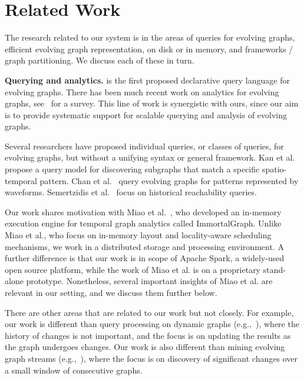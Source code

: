 \section{Related Work}
\label{sec:related}

The research related to our \ql system is in the areas of queries for
evolving graphs, efficient evolving graph representation, on disk or
in memory, and frameworks / graph partitioning.  We discuss each of
these in turn.

{\bf Querying and analytics.} \ql is the first proposed declarative
query language for evolving graphs.  There has been much recent work
on analytics for evolving graphs,
see~\cite{DBLP:journals/csur/AggarwalS14} for a survey. This line of
work is synergistic with ours, since our aim is to provide systematic
support for scalable querying and analysis of evolving graphs.

Several researchers have proposed individual queries, or classes of
queries, for evolving graphs, but without a unifying syntax or general
framework.  Kan et al.~\cite{Kan2009} propose a query model for
discovering subgraphs that match a specific spatio-temporal pattern.
Chan et al.~\cite{Chan2008} query evolving graphs for patterns
represented by waveforms.  Semertzidis et al.~\cite{Semertzidis2015}
focus on historical reachability queries.

Our work shares motivation with Miao et
al.~\cite{DBLP:journals/tos/MiaoHLWYZPCC15}, who developed an
in-memory execution engine for temporal graph analytics called
ImmortalGraph.  Unlike Miao et al., who focus on in-memory layout and
locality-aware scheduling mechanisms, we work in a distributed storage
and processing environment.  A further difference is that our work is
in scope of Apache Spark, a widely-used open source platform, while
the work of Miao et al. is on a proprietary stand-alone prototype.
Nonetheless, several important insights of Miao et al. are relevant in
our setting, and we discuss them further below.

There are other areas that are related to our work but not closely.
For example, our work is different than query processing on dynamic
graphs (e.g.,~\cite{Mondal2012}), where the history of changes is not
important, and the focus is on updating the results as the graph
undergoes changes.  Our work is also different than mining evolving
graph streams (e.g.,~\cite{Liu2010}), where the focus is on discovery
of significant changes over a small window of consecutive graphs.


